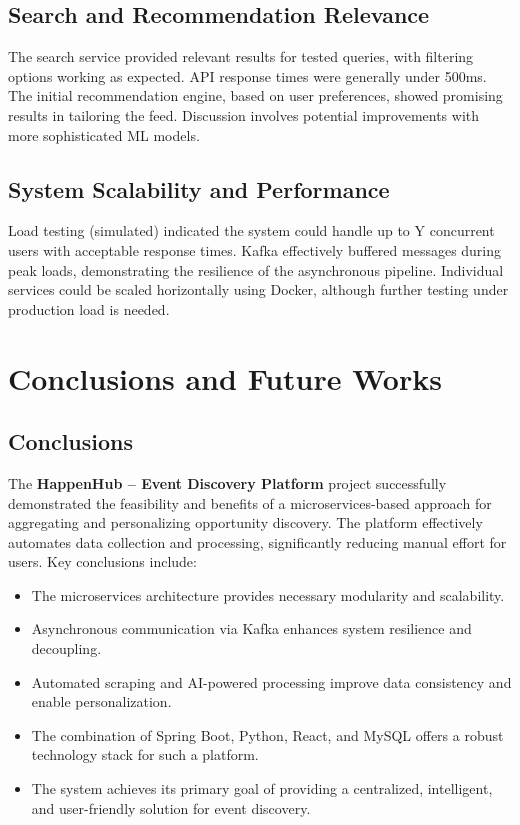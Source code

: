 \documentclass[12pt, a4paper]{report}
\begin{document}
\section{Search and Recommendation Relevance}
The search service provided relevant results for tested queries, with filtering options working as expected. API response times were generally under 500ms. The initial recommendation engine, based on user preferences, showed promising results in tailoring the feed. Discussion involves potential improvements with more sophisticated ML models.

\section{System Scalability and Performance}
Load testing (simulated) indicated the system could handle up to Y concurrent users with acceptable response times. Kafka effectively buffered messages during peak loads, demonstrating the resilience of the asynchronous pipeline. Individual services could be scaled horizontally using Docker, although further testing under production load is needed.

\chapter{Conclusions and Future Works} %

\section{Conclusions} %
The \textbf{HappenHub – Event Discovery Platform} project successfully demonstrated the feasibility and benefits of a microservices-based approach for aggregating and personalizing opportunity discovery. The platform effectively automates data collection and processing, significantly reducing manual effort for users. Key conclusions include:
\begin{itemize}
    \item The microservices architecture provides necessary modularity and scalability.
    \item Asynchronous communication via Kafka enhances system resilience and decoupling.
    \item Automated scraping and AI-powered processing improve data consistency and enable personalization.
    \item The combination of Spring Boot, Python, React, and MySQL offers a robust technology stack for such a platform.
    \item The system achieves its primary goal of providing a centralized, intelligent, and user-friendly solution for event discovery.
\end{itemize}
\end{document}
